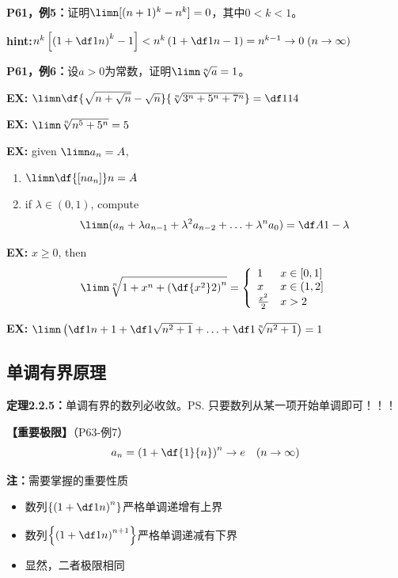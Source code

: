 {\bf P61，例5：}证明$\limn [(n+1)^k-{n}^k]=0$，其中$0<k<1$。

{\bf hint:}$n^k\left[\left(1+\df1n\right)^k-1\right]
<n^k\left(1+\df1n-1\right)=n^{k-1}\to 0\;(n\to\infty)$

{\bf P61，例6：}设$a>0$为常数，证明$\limn \sqrt[n]{a}=1$。

{\bf EX:} $\limn\df{\sqrt{n+\sqrt n}-\sqrt n}{\sqrt[n]{3^n+5^n+7^n}}=\df1{14}$

{\bf EX:} $\limn\sqrt[n]{n^5+5^n}=5$

{\bf EX:} given $\limn a_n=A$,
\begin{enumerate}
  \item $\limn\df{[na_n]}n=A$
  \item if $\lambda\in(0,1)$, compute
  $$\limn(a_n+\lambda a_{n-1}+\lambda^2a_{n-2}+\ldots+\lambda^na_0)=\df
  A{1-\lambda}$$
\end{enumerate}

{\bf EX:} $x\geq 0$, then
$$\limn\sqrt[n]{1+x^n+\left(\df{x^2}2\right)^n}=
\left\{\begin{array}{ll}
1&x\in[0,1]\\ x & x\in(1,2]\\ \frac{x^2}2& x>2
\end{array}\right.$$

{\bf EX:} $\limn\left(\df1{n+1}+\df1{\sqrt{n^2+1}}+\ldots
+\df1{\sqrt[n]{n^2+1}}\right)=1$

\subsection{单调有界原理}

{\bf 定理2.2.5：}单调有界的数列必收敛。\ps{只要数列从某一项开始单调即可！！！}

{\bf 【重要极限】}（P63-例7）
$$a_n=\left(1+\df{1}{n}\right)^n\to e\quad (n\to\infty)$$

{\bf 注：}需要掌握的重要性质
\begin{itemize}
  \setlength{\itemindent}{1cm}
  \item 数列$\left\{\left(1+\df 1n\right)^n\right\}$严格单调递增有上界
  \item 数列$\left\{\left(1+\df 1n\right)^{n+1}\right\}$严格单调递减有下界
  \item 显然，二者极限相同
\end{itemize}

